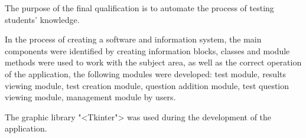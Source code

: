 The purpose of the final qualification is to automate the process of testing students' knowledge.

In the process of creating a software and information system, the main components were identified by creating information blocks, classes and module methods were used to work with the subject area, as well as the correct operation of the application, the following modules were developed: test module, results viewing module, test creation module, question addition module, test question viewing module, management module by users.

The graphic library "<Tkinter"> was used during the development of the application.
